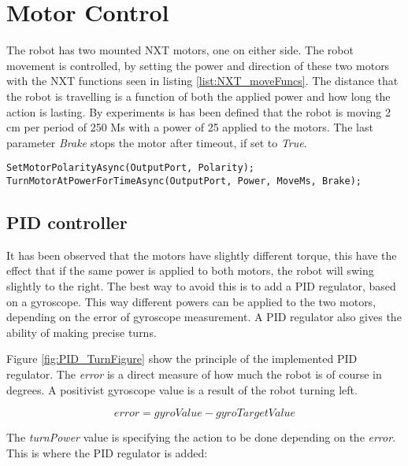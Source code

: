 
\section{Motor Control}
\label{sec:motorControl}

The robot has two mounted NXT motors, one on either side.
The robot movement is controlled, by setting the power and direction of these two motors with the NXT functions seen in listing \ref{list:NXT_moveFuncs}.
The distance that the robot is travelling is a function of both the applied power and how long the action is lasting.
By experiments is has been defined that the robot is moving 2 cm per period of 250 Ms with a power of 25 applied to the motors.
The last parameter \emph{Brake} stops the motor after timeout, if set to \emph{True}.

\begin{lstlisting}[caption={The two NXT funtions used to control the motors.}, label=list:NXT_moveFuncs]
SetMotorPolarityAsync(OutputPort, Polarity);
TurnMotorAtPowerForTimeAsync(OutputPort, Power, MoveMs, Brake);
\end{lstlisting}

\subsection{PID controller}

It has been observed that the motors have slightly different torque, this have the effect that if the same power is applied to both motors, the robot will swing slightly to the right.
The best way to avoid this is to add a PID regulator, based on a gyroscope.
This way different powers can be applied to the two motors, depending on the error of gyroscope measurement.
A PID regulator also gives the ability of making precise turns.


Figure \ref{fig:PID_TurnFigure} show the principle of the implemented PID regulator.
The \emph{error} is a direct measure of how much the robot is of course in degrees. A positivist gyroscope value is a result of the robot turning left.

$$ error = gyroValue - gyroTargetValue $$

The \emph{turnPower} value is specifying the action to be done depending on the \emph{error}. This is where the PID regulator is added:

